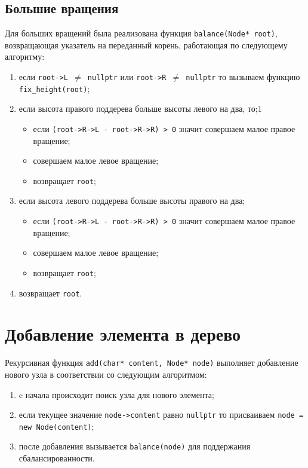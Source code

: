 \subsection*{Большие вращения}
Для больших вращений была реализована функция \texttt{balance(Node* root)}, возвращающая указатель на переданный корень, работающая по следующему алгоритму:
\begin{enumerate}
	\item если \texttt{root->L $\neq$ nullptr} или \texttt{root->R $\neq$ nullptr} то вызываем функцию \newline \texttt{fix\_height(root)};
	\item если высота правого поддерева больше высоты левого на два, то;1
	\begin{itemize}
		\item если \texttt{(root->R->L - root->R->R) > 0} значит совершаем малое правое вращение;
		\item совершаем малое левое вращение; 
		\item возвращает \texttt{root};
	\end{itemize} 
	\item если высота левого поддерева больше высоты правого на два;
	\begin{itemize}
		\item если \texttt{(root->R->L - root->R->R) > 0} значит совершаем малое правое вращение;
		\item совершаем малое левое вращение; 
		\item возвращает \texttt{root};
	\end{itemize}
	\item возвращает \texttt{root}.
\end{enumerate}

\section{Добавление элемента в дерево}
Рекурсивная функция \texttt{add(char* content, Node* node)} выполняет добавление нового узла в соответствии со следующим алгоритмом:
\begin{enumerate}
	\item c начала происходит поиск узла для нового элемента;
	\item если текущее значение \texttt{node->content} равно \texttt{nullptr} то присваиваем \texttt{node = new Node(content)};
	\item после добавления вызывается \texttt{balance(node)} для поддержания сбалансированности.
\end{enumerate}

